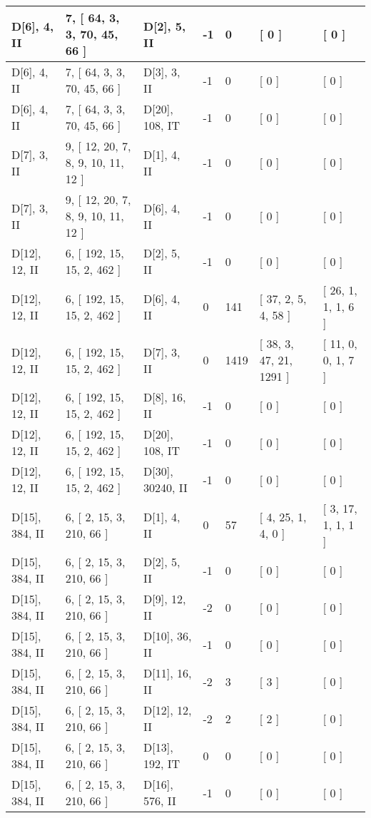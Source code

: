 \documentclass[9 pt]{scrartcl}
\begin{document}
\begin{longtable}{ |p{3em}|p{6em}|p{3em}|p{2em}|p{2em}|p{6em}|p{6em}| }
D[6], 4, II &7, [ 64, 3, 3, 70, 45, 66 ] & D[2], 5, II  & -1 & 0 & [ 0 ] & [ 0 ]\\ \hline
D[6], 4, II &7, [ 64, 3, 3, 70, 45, 66 ] & D[3], 3, II  & -1 & 0 & [ 0 ] & [ 0 ]\\ \hline
D[6], 4, II &7, [ 64, 3, 3, 70, 45, 66 ] & D[20], 108, IT  & -1 & 0 & [ 0 ] & [ 0 ]\\ \hline
D[7], 3, II &9, [ 12, 20, 7, 8, 9, 10, 11, 12 ] & D[1], 4, II  & -1 & 0 & [ 0 ] & [ 0 ]\\ \hline
D[7], 3, II &9, [ 12, 20, 7, 8, 9, 10, 11, 12 ] & D[6], 4, II  & -1 & 0 & [ 0 ] & [ 0 ]\\ \hline
D[12], 12, II &6, [ 192, 15, 15, 2, 462 ] & D[2], 5, II  & -1 & 0 & [ 0 ] & [ 0 ]\\ \hline
D[12], 12, II &6, [ 192, 15, 15, 2, 462 ] & D[6], 4, II  & 0 & 141 & [ 37, 2, 5, 4, 58 ] & [ 26, 1, 1, 1, 6 ]\\ \hline
D[12], 12, II &6, [ 192, 15, 15, 2, 462 ] & D[7], 3, II  & 0 & 1419 & [ 38, 3, 47, 21, 1291 ] & [ 11, 0, 0, 1, 7 ]\\ \hline
D[12], 12, II &6, [ 192, 15, 15, 2, 462 ] & D[8], 16, II  & -1 & 0 & [ 0 ] & [ 0 ]\\ \hline
D[12], 12, II &6, [ 192, 15, 15, 2, 462 ] & D[20], 108, IT  & -1 & 0 & [ 0 ] & [ 0 ]\\ \hline
D[12], 12, II &6, [ 192, 15, 15, 2, 462 ] & D[30], 30240, II  & -1 & 0 & [ 0 ] & [ 0 ]\\ \hline
D[15], 384, II &6, [ 2, 15, 3, 210, 66 ] & D[1], 4, II  & 0 & 57 & [ 4, 25, 1, 4, 0 ] & [ 3, 17, 1, 1, 1 ]\\ \hline
D[15], 384, II &6, [ 2, 15, 3, 210, 66 ] & D[2], 5, II  & -1 & 0 & [ 0 ] & [ 0 ]\\ \hline
D[15], 384, II &6, [ 2, 15, 3, 210, 66 ] & D[9], 12, II  & -2 & 0 & [ 0 ] & [ 0 ]\\ \hline
D[15], 384, II &6, [ 2, 15, 3, 210, 66 ] & D[10], 36, II  & -1 & 0 & [ 0 ] & [ 0 ]\\ \hline
D[15], 384, II &6, [ 2, 15, 3, 210, 66 ] & D[11], 16, II  & -2 & 3 & [ 3 ] & [ 0 ]\\ \hline
D[15], 384, II &6, [ 2, 15, 3, 210, 66 ] & D[12], 12, II  & -2 & 2 & [ 2 ] & [ 0 ]\\ \hline
D[15], 384, II &6, [ 2, 15, 3, 210, 66 ] & D[13], 192, IT  & 0 & 0 & [ 0 ] & [ 0 ]\\ \hline
D[15], 384, II &6, [ 2, 15, 3, 210, 66 ] & D[16], 576, II  & -1 & 0 & [ 0 ] & [ 0 ]\\ \hline

\end{longtable}
\end{document}
